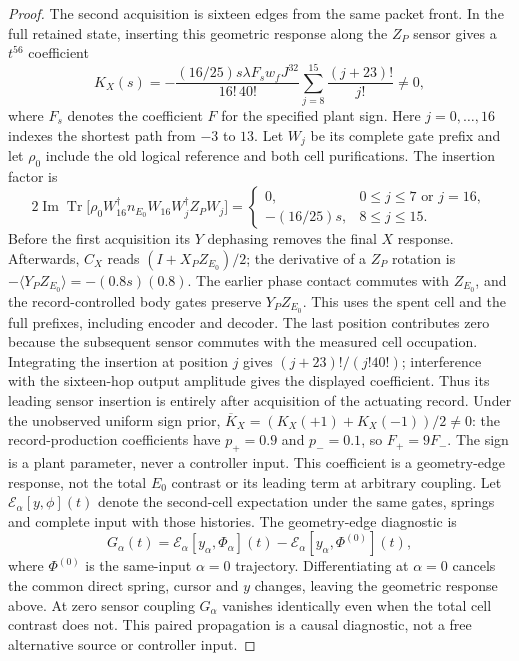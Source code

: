 \documentclass[12pt]{article}
\theoremstyle{definition}
\theoremstyle{remark}
\begin{document}
\begin{proof}
The second acquisition is sixteen edges from the same packet
front. In the full retained state, inserting this geometric
response along the $Z_P$ sensor gives a $t^{56}$ coefficient
\[
 K_X(s)=-\frac{(16/25)s\lambda F_sw_fJ^{32}}{16!\,40!}
       \sum_{j=8}^{15}\frac{(j+23)!}{j!}\ne0,
\]
where $F_s$ denotes the coefficient $F$ for the specified plant sign.
Here $j=0,\ldots,16$ indexes the shortest path from $-3$ to $13$.
Let $W_j$ be its complete gate prefix and let $\rho_0$ include
the old logical reference and both cell purifications. The insertion
factor is
\[
 2\operatorname{Im}\operatorname{Tr}
 \bigl[\rho_0 W_{16}^{\dagger}n_{E_0}W_{16}
                   W_j^{\dagger}Z_PW_j\bigr]
 =\begin{cases}
 0,&0\le j\le7\text{ or }j=16,\\
 -(16/25)s,&8\le j\le15.
 \end{cases}
\]
Before the first acquisition its $Y$ dephasing removes the final
$X$ response. Afterwards, $C_X$ reads
$(I+X_PZ_{E_0})/2$; the derivative of a $Z_P$ rotation is
$-\langle Y_PZ_{E_0}\rangle=-(0.8s)(0.8)$.
The earlier phase contact commutes with $Z_{E_0}$, and the
record-controlled body gates preserve $Y_PZ_{E_0}$. This uses the
spent cell and the full prefixes, including encoder and decoder.
The last position contributes zero because the subsequent sensor
commutes with the measured cell occupation. Integrating the insertion
at position $j$ gives $(j+23)!/(j!40!)$; interference with the
sixteen-hop output amplitude gives the displayed coefficient.
Thus its leading sensor insertion is entirely after acquisition
of the actuating record. Under the unobserved uniform sign prior,
$\overline K_X=(K_X(+1)+K_X(-1))/2\ne0$: the record-production
coefficients have $p_+=0.9$ and $p_-=0.1$, so $F_+=9F_-$.
The sign is a plant parameter, never a controller input.
This coefficient is a geometry-edge response, not the total
$E_0$ contrast or its leading term at arbitrary coupling.
Let $\mathscr E_\alpha[y,\phi](t)$ denote the second-cell expectation
under the same gates, springs and complete input with those histories.
The geometry-edge diagnostic is
\[
 G_\alpha(t)=\mathscr E_\alpha[y_\alpha,\Phi_\alpha](t)
       -\mathscr E_\alpha[y_\alpha,\Phi^{(0)}](t),
\]
where $\Phi^{(0)}$ is the same-input $\alpha=0$ trajectory.
Differentiating at $\alpha=0$ cancels the common direct spring,
cursor and $y$ changes, leaving the geometric response above.
At zero sensor coupling $G_\alpha$ vanishes identically even when
the total cell contrast does not. This paired propagation is a
causal diagnostic, not a free alternative source or controller input.


\end{proof}
\end{document}
